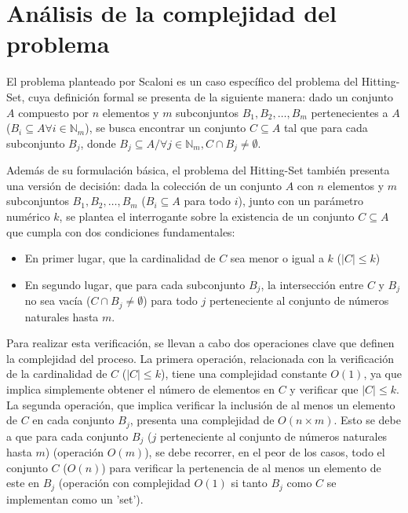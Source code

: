 \section{Análisis de la complejidad del problema}

El problema planteado por Scaloni es un caso específico del problema del 
Hitting-Set, cuya definición formal se presenta de la siguiente manera: dado un 
conjunto $A$ compuesto por $n$ elementos y $m$ subconjuntos $B_{1}, B_{2}, \dots, B_{m}$ 
pertenecientes a $A$ ($B_{i}\subseteq A \forall i \in \mathbb{N}_{m}$), se busca encontrar un conjunto $C \subseteq A$ tal que para cada 
subconjunto $B_{j}$, donde $B_{j} \subseteq A / \forall j \in \mathbb{N}_{m},  C \cap B_{j}\neq \emptyset$. 

Además de su formulación básica, el problema del Hitting-Set también presenta una versión
de decisión: dada la colección de un conjunto $A$ con $n$ elementos y $m$ subconjuntos
$B_{1}, B_{2}, \dots, B_{m}$ ($B_{i}\subseteq A$ para todo $i$), junto con un 
parámetro numérico $k$, se plantea el interrogante sobre la existencia de un conjunto 
$C \subseteq A$ que cumpla con dos condiciones fundamentales:

\begin{itemize}
    \item En primer lugar, que la cardinalidad de $C$ sea menor o igual a $k$ ($\left| C \right|\leq k$) 
    \item En segundo lugar, que para cada subconjunto $B_{j}$, la intersección entre $C$ y $B_{j}$ no sea vacía ($C \cap B_{j} \neq \emptyset$) para todo $j$ perteneciente al conjunto de  números naturales hasta $m$.
\end{itemize}

Para realizar esta verificación, se llevan a cabo dos operaciones clave que definen la 
complejidad del proceso. La primera operación, relacionada con la verificación de la 
cardinalidad de $C$ ($\left| C \right|\leq k$), tiene una complejidad constante $O(1)$, 
ya que implica simplemente obtener el número de elementos en $C$ y verificar que $\left|C\right| \leq k$.
La segunda operación, que implica verificar la inclusión de al menos un elemento de $C$ 
en cada conjunto $B_{j}$, presenta una complejidad de $O(n \times m)$. Esto se debe a 
que para cada conjunto $B_{j}$ ($j$ perteneciente al conjunto de números naturales hasta 
$m$) (operación $O(m)$), se debe recorrer, en el peor de los casos, todo el conjunto $C$ 
($O(n)$) para verificar la pertenencia de al menos un elemento de este en $B_{j}$ 
(operación con complejidad $O(1)$ si tanto $B_{j}$ como $C$ se implementan como un 'set').

